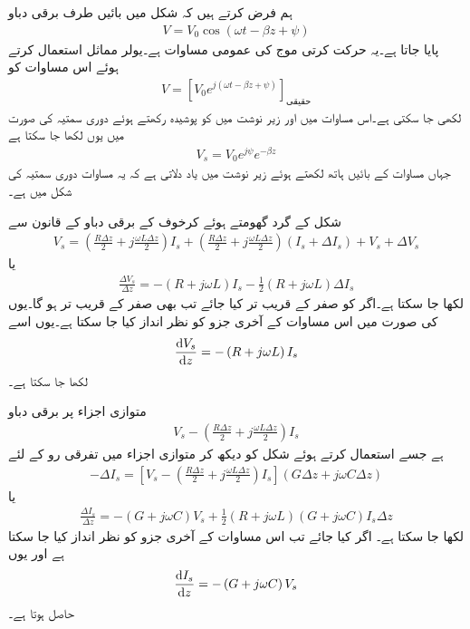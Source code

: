 ہم فرض کرتے ہیں کہ شکل  میں بائیں طرف برقی دباو
\begin{align*}
V=V_0 \cos (\omega t -\beta z +\psi)
\end{align*}
پایا جاتا ہے۔یہ حرکت کرتی موج کی عمومی مساوات ہے۔یولر مماثل استعمال کرتے ہوئے اس مساوات کو
\begin{align*}
V=\left[ V_0 e^{j(\omega t -\beta z +\psi)}\right]_{\text{حقیقی}}
\end{align*}
لکھی جا سکتی ہے۔اس مساوات میں  اور زیر نوشت میں  کو پوشیدہ رکھتے ہوئے دوری سمتیہ کی صورت میں یوں لکھا جا سکتا ہے
\begin{align*}
V_s =V_0 e^{j \psi} e^{-\beta z}
\end{align*}
جہاں مساوات کے بائیں ہاتھ  لکھتے ہوئے زیر نوشت میں  یاد دلاتی ہے کہ یہ مساوات دوری سمتیہ کی شکل میں ہے۔ 

شکل  کے گرد گھومتے ہوئے کرخوف کے برقی دباو کے قانون سے
\begin{align*}
V_s=\left(\frac{R\Delta z}{2} + j \frac{\omega L \Delta z}{2}\right) I_s+\left(\frac{R\Delta z}{2} + j \frac{\omega L \Delta z}{2}\right) \left(I_s+\Delta I_s \right)+V_s+\Delta V_s
\end{align*}
یا
\begin{align*}
\frac{\Delta V_s}{\Delta z} =-\left(R+j\omega L \right) I_s-\frac{1}{2}\left(R+j\omega L \right)\Delta I_s
\end{align*}
لکھا جا سکتا ہے۔اگر  کو صفر کے قریب تر کیا جائے تب  بھی صفر کے قریب تر ہو گا۔یوں  کی صورت میں اس مساوات کے آخری جزو کو نظر انداز کیا جا سکتا ہے۔یوں اسے
\begin{align}\label{مساوات_ترسیل_دباو_تفرقی_مساوات}
\frac{\dif V_s}{\dif z}=-\left(R+j\omega L \right) I_s
\end{align}
لکھا جا سکتا ہے۔

متوازی اجزاء پر برقی دباو
\begin{align*}
V_s-\left(\frac{R \Delta z}{2}+j\frac{\omega L \Delta z}{2} \right) I_s
\end{align*}
ہے جسے استعمال کرتے ہوئے شکل کو دیکھ کر متوازی اجزاء میں تفرقی رو کے لئے
\begin{align*}
-\Delta I_s = \left[V_s-\left(\frac{R \Delta z}{2}+j\frac{\omega L \Delta z}{2} \right) I_s \right] \left(G \Delta z+j \omega C \Delta z \right)
\end{align*}
یا
\begin{align*}
\frac{\Delta I_s}{\Delta z}=-\left(G+j \omega C \right) V_s +\frac{1}{2}\left(R+j \omega L \right)\left(G+j \omega C \right) I_s \Delta z
\end{align*}
لکھا جا سکتا ہے۔ اگر  کیا جائے تب اس مساوات کے آخری جزو کو نظر انداز کیا جا سکتا ہے اور یوں
\begin{align}\label{مساوات_ترسیل_رو_تفرقی_مساوات}
\frac{\dif I_s}{\dif z}=-\left(G+j \omega C \right) V_s
\end{align}
 حاصل ہوتا ہے۔

